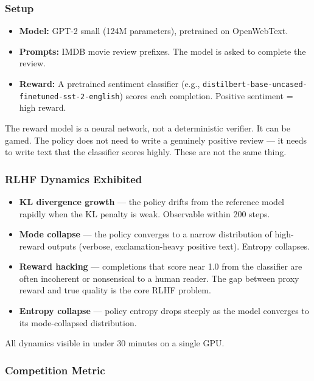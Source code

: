 \subsubsection*{Setup}

\begin{itemize}
  \item \textbf{Model:} GPT-2 small (124M parameters), pretrained on OpenWebText.
  \item \textbf{Prompts:} IMDB movie review prefixes. The model is asked to complete the review.
  \item \textbf{Reward:} A pretrained sentiment classifier (e.g., \texttt{distilbert-base-uncased-finetuned-sst-2-english}) scores each completion. Positive sentiment = high reward.
\end{itemize}

The reward model is a neural network, not a deterministic verifier. It can be gamed. The policy does not need to write a genuinely positive review --- it needs to write text that the classifier scores highly. These are not the same thing.

\subsubsection*{RLHF Dynamics Exhibited}

\begin{itemize}
  \item \textbf{KL divergence growth} --- the policy drifts from the reference model rapidly when the KL penalty is weak. Observable within 200 steps.
  \item \textbf{Mode collapse} --- the policy converges to a narrow distribution of high-reward outputs (verbose, exclamation-heavy positive text). Entropy collapses.
  \item \textbf{Reward hacking} --- completions that score near 1.0 from the classifier are often incoherent or nonsensical to a human reader. The gap between proxy reward and true quality is the core RLHF problem.
  \item \textbf{Entropy collapse} --- policy entropy drops steeply as the model converges to its mode-collapsed distribution.
\end{itemize}

All dynamics visible in under 30 minutes on a single GPU.

\subsubsection*{Competition Metric}

